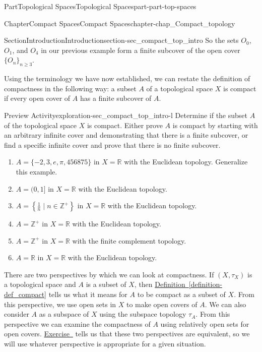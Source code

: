 \documentclass[oneside,10pt,]{book}
\newcommand{\xreffont}{\relax}
\numberwithin{equation}{chapter}
\newcommand{\Z}{\mathbb{Z}}
\newcommand{\R}{\mathbb{R}}
\begin{document}
\begin{partptx}{Part}{Topological Spaces}{}{Topological Spaces}{}{}{part-part-top-spaces}
\begin{chapterptx}{Chapter}{Compact Spaces}{}{Compact Spaces}{}{}{chapter-chap_Compact_topology}
\begin{sectionptx}{Section}{Introduction}{}{Introduction}{}{}{section-sec_compact_top_intro}
So the sets \(O_0\), \(O_1\), and \(O_4\) in our previous example form a finite subcover of the open cover \(\{O_n\}_{n \geq 3}\).%
\par
Using the terminology we have now established, we can restate the definition of compactness in the following way: a subset \(A\) of a topological space \(X\) is compact if every open cover of \(A\) has a finite subcover of \(A\).%
\begin{exploration}{Preview Activity}{}{exploration-sec_compact_top_intro-l}%
Determine if the subset \(A\) of the topological space \(X\) is compact. Either prove \(A\) is compact by starting with an arbitrary infinite cover and demonstrating that there is a finite subcover, or find a specific infinite cover and prove that there is no finite subcover.%
\begin{enumerate}[font=\bfseries,label=(\alph*),ref=\alph*]%
\item{}\(A = \{-2, 3, e, \pi, 456875\}\) in \(X = \R\) with the Euclidean topology. Generalize this example.%
\item{}\(A = (0, 1]\) in \(X = \R\) with the Euclidean topology.%
\item{}\(A = \left\{\frac{1}{n} \mid n \in \Z^+\right\}\) in \(X = \R\) with the Euclidean topology.%
\item{}\(A = \Z^+\) in \(X = \R\) with the Euclidean topology.%
\item{}\(A = \Z^+\) in \(X = \R\) with the finite complement topology.%
\item{}\(A = \R\) in \(X = \R\) with the Euclidean topology.%
\end{enumerate}%
\end{exploration}%
There are two perspectives by which we can look at compactness. If \((X,\tau_X)\) is a topological space and \(A\) is a subset of \(X\), then \hyperref[definition-def_compact]{Definition~{\xreffont\ref{definition-def_compact}}} tells us what it means for \(A\) to be compact as a subset of \(X\). From this perspective, we use open sets in \(X\) to make open covers of \(A\). We can also consider \(A\) as a subspace of \(X\) using the subspace topology \(\tau_A\). From this perspective we can examine the compactness of \(A\) using relatively open sets for open covers. \hyperlink{exercise-ex_subspace_compact}{Exercise~{\xreffont 14}} tells us that these two perspectives are equivalent, so we will use whatever perspective is appropriate for a given situation.%
\end{sectionptx}
%
%
\typeout{************************************************}

\end{chapterptx}
\end{partptx}
\end{document}
